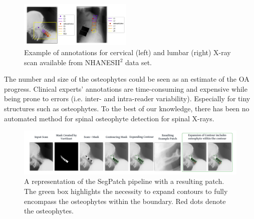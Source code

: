 \documentclass{article}
\newcommand{\soumya}[1]{\textcolor{red}{#1}}
\begin{document}


\begin{figure}
    \centering
    \includegraphics[width=0.48\textwidth]{images/Annotated_NHANES.png}
    \caption{Example of annotations for cervical (left) and lumbar (right) X-ray scan available from NHANESII$^2$ data set.}
    \label{fig:nhanes-osteophyte-label}
\end{figure}

The number and size of the osteophytes could be seen as an estimate of the OA progress. Clinical experts' annotations are time-consuming and expensive while being prone to errors (i.e. inter- and intra-reader variability). Especially for tiny structures such as osteophytes. To the best of our knowledge, there has been no automated method for spinal osteophyte detection for spinal X-rays. 

\begin{figure}[t]
    \centering
    \includegraphics[width=1\textwidth]{images/Pipe-SegPatch.png}
    \caption{A representation of the SegPatch pipeline with a resulting patch. The green box highlights the necessity to expand contours to fully encompass the osteophytes within the boundary. Red dots denote the osteophytes.}
    \label{fig:pipeline}
\end{figure}

\end{document}

